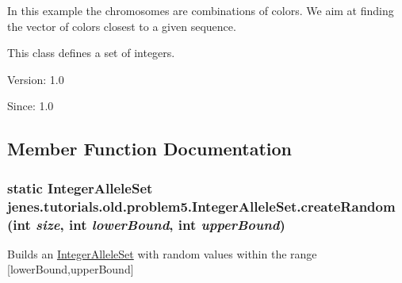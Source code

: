 In this example the chromosomes are combinations of colors. We aim at finding the vector of colors closest to a given sequence.

This class defines a set of integers.

\begin{Desc}
\item[Version:]1.0 \end{Desc}
\begin{Desc}
\item[Since:]1.0 \end{Desc}


\subsection{Member Function Documentation}
\hypertarget{classjenes_1_1tutorials_1_1old_1_1problem5_1_1_integer_allele_set_ab816bbf2219835d788ceb8b8a92007c}{
\subsubsection[createRandom]{\setlength{\rightskip}{0pt plus 5cm}static {\bf IntegerAlleleSet} jenes.tutorials.old.problem5.IntegerAlleleSet.createRandom (int {\em size}, \/  int {\em lowerBound}, \/  int {\em upperBound})}}
\label{classjenes_1_1tutorials_1_1old_1_1problem5_1_1_integer_allele_set_ab816bbf2219835d788ceb8b8a92007c}


Builds an \hyperlink{classjenes_1_1tutorials_1_1old_1_1problem5_1_1_integer_allele_set}{IntegerAlleleSet} with random values within the range \mbox{[}lowerBound,upperBound\mbox{]} 

